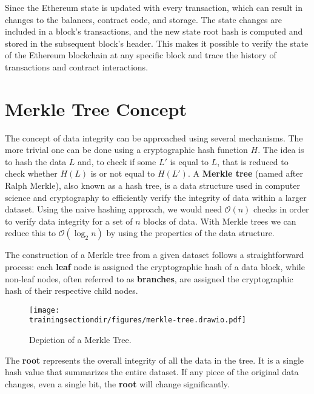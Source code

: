Since the Ethereum state is updated with every transaction, which can result in changes to the balances, contract code, and storage. The state changes are included in a block's transactions, and the new state root hash is computed and stored in the subsequent block's header. This makes it possible to verify the state of the Ethereum blockchain at any specific block and trace the history of transactions and contract interactions.








\section{Merkle Tree Concept} \label{sec:merkle-trees}

The concept of data integrity can be approached using several mechanisms. The more trivial one can be done using a cryptographic hash function $H$. The idea is to hash the data $L$ and, to check if some $L'$ is equal to $L$, that is reduced to check whether $H(L)$ is or not equal to $H(L')$. A \textbf{Merkle tree} (named after Ralph Merkle), also known as a hash tree, is a data structure used in computer science and cryptography to efficiently verify the integrity of data within a larger dataset. Using the naive hashing approach, we would need $\mathcal{O}(n)$ checks in order to verify data integrity for a set of $n$ blocks of data. With Merkle trees we can reduce this to $\mathcal{O}(\log_2 n)$ by using the properties of the data structure.

The construction of a Merkle tree from a given dataset follows a straightforward process: each \textbf{leaf} node is assigned the cryptographic hash of a data block, while non-leaf nodes, often referred to as \textbf{branches}, are assigned the cryptographic hash of their respective child nodes.

\begin{figure}[H]
\centering
\texttt{[image: \\trainingsectiondir/figures/merkle-tree.drawio.pdf]}
\caption{Depiction of a Merkle Tree.}
\label{fig:merkle-tree}
\end{figure}

The \textbf{root} represents the overall integrity of all the data in the tree. It is a single hash value that summarizes the entire dataset. If any piece of the original data changes, even a single bit, the \textbf{root} will change significantly.

